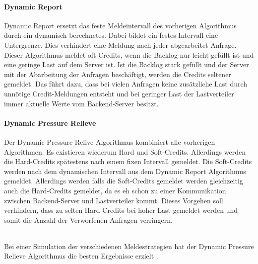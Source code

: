 \documentclass[a4paper, 12pt, BCOR10mm, DIV12, toc=bibliography, toc=listof, german]{scrbook}
\begin{document}

	\paragraph{Dynamic Report} %
	\label{par:dynamic-report}

	Dynamic Report ersetzt das feste Meldeintervall des vorherigen Algorithmus durch ein dynamisch
	berechnetes. Dabei bildet ein festes Intervall eine Untergrenze. Dies verhindert eine Meldung nach
	jeder abgearbeitet Anfrage. Dieser Algorithmus meldet oft Credits, wenn die Backlog nur leicht
	gefüllt ist und eine geringe Last	auf dem Server ist. Ist die Backlog stark gefüllt und der
	Server mit der Abarbeitung der Anfragen beschäftigt, werden die Credits seltener gemeldet. Das
	führt dazu, dass bei vielen Anfragen keine zusätzliche Last durch unnötige Credit-Meldungen entsteht
	und bei geringer Last der Lastverteiler immer aktuelle Werte vom Backend-Server besitzt.
	

	\paragraph{Dynamic Pressure Relieve} %
	\label{par:dynamic-pressure-relieve}
	
	Der Dynamic Pressure Relive Algorithmus kombiniert alle vorherigen Algorithmen. Es existieren
	wiederum Hard und Soft-Credits. Allerdings werden die Hard-Credits spätestens nach einem fixen
	Intervall gemeldet. Die Soft-Credits werden nach dem dynamischen Intervall aus dem Dynamic Report
	Algorithmus gemeldet. Allerdings werden falls die Soft-Credits gemeldet werden gleichzeitig auch
	die Hard-Credits gemeldet, da es eh schon zu einer Kommunikation zwischen Backend-Server und
	Lastverteiler kommt. Dieses Vorgehen soll verhindern, dass zu selten Hard-Credits bei hoher Last
	gemeldet werden und somit die Anzahl der Verworfenen Anfragen verringern.

$~$\\

	Bei einer Simulation der verschiedenen Meldestrategien hat der Dynamic Pressure Relieve
	Algorithmus die besten Ergebnisse erzielt \cite{scsczile2008}.
\end{document}
